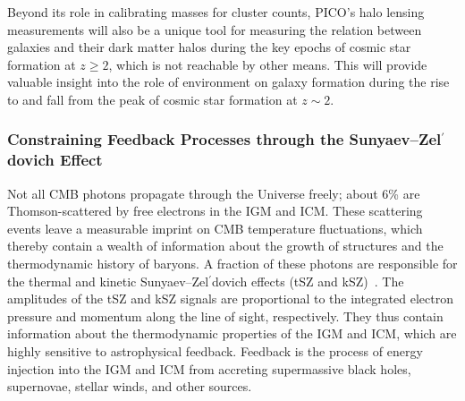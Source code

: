 \documentclass[PICOReport.tex]{subfiles}
\begin{document}
Beyond its role in calibrating masses for cluster counts, PICO's halo lensing measurements will also be a unique tool for measuring the relation between galaxies and their dark matter halos during the key epochs of cosmic star formation at $z\geq 2$, which is not reachable by other means.  This will provide valuable insight into the role of environment on galaxy formation during the rise to and fall from the peak of cosmic star formation at $z\sim 2$. 



\subsubsection{Constraining Feedback Processes through the Sunyaev--Zel$^{\prime}$dovich Effect}
\label{sec:sz}



Not all CMB photons propagate through the Universe freely; about 6\% are Thomson-scattered by free electrons in the \ac{IGM} and \ac{ICM}.  These scattering events leave a measurable imprint on \ac{CMB} temperature fluctuations, which thereby contain a wealth of information about the growth of structures and the thermodynamic history of baryons. A fraction of these photons are responsible for the thermal and kinetic Sunyaev--Zel$^{\prime}$dovich effects (tSZ and kSZ)~\citep{zeldovich69,SZ1972}. The amplitudes of the tSZ and kSZ signals are proportional to the integrated electron pressure and momentum along the line of sight, respectively.  They thus contain information about the thermodynamic properties of the \ac{IGM} and \ac{ICM}, which are highly sensitive to astrophysical feedback. Feedback is the process of energy injection into the \ac{IGM} and \ac{ICM} from accreting supermassive black holes, supernovae, stellar winds, and other sources. 

\end{document}
